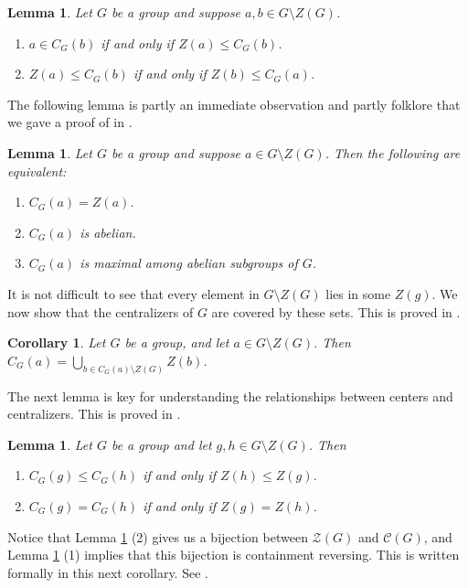 \documentclass[12pt]{amsart}
\newtheorem{corollary}[theorem]{Corollary}
\newtheorem{lemma}[theorem]{Lemma}
\begin{document}
{\begin{lemma} \label{three}
Let $G$ be a group and suppose $a,b \in G \setminus Z(G)$.
\begin{enumerate}
\item $a \in C_G(b)$ if and only if $Z(a) \le C_G (b)$.
\item $Z(a) \le C_G (b)$ if and only if $Z(b) \le C_G (a)$.
\end{enumerate}
\end{lemma}

The following lemma is partly an immediate observation and partly folklore that we gave a proof of in \cite{max abel}.

\begin{lemma} \label{abel cent}
Let $G$ be a group and suppose $a \in G \setminus Z(G)$.  Then the following are equivalent:
\begin{enumerate}
\item $C_G (a) = Z (a)$.
\item $C_G (a)$ is abelian.
\item $C_G (a)$ is maximal among abelian subgroups of $G$.
\end{enumerate}
\end{lemma}

It is not difficult to see that every element in $G \setminus Z(G)$ lies in some $Z(g)$.  We now show that the centralizers of $G$ are covered by these sets.  This is proved in \cite{centgraph}.

\begin{corollary} \label{centr equal union cents}
Let $G$ be a group, and let $a \in G \setminus Z(G)$.  Then $\displaystyle C_G (a) = \bigcup_{b \in C_G(a) \setminus Z(G)} Z(b)$.
\end{corollary}

The next lemma is key for understanding the relationships between centers and centralizers.  This is proved in \cite{centgraph}. 

\begin{lemma} \label{star 1}
Let $G$ be a group and let $g, h \in G \setminus Z(G)$.  Then 
\begin{enumerate}
\item $C_G (g) \le C_G (h)$ if and only if $Z(h) \le Z(g)$.
\item $C_G (g) = C_G (h)$ if and only if $Z (g) = Z(h)$.
\end{enumerate}
\end{lemma}

Notice that Lemma \ref{star 1} (2) gives us a bijection between $\mathcal{Z} (G)$ and $\mathcal {C} (G)$, and Lemma \ref{star 1} (1) implies that this bijection is containment reversing.  This is written formally in this next corollary.  See \cite{centgraph}.

}
\end{document}
